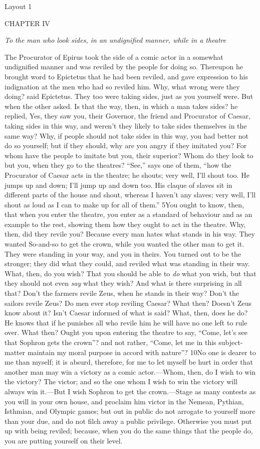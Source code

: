 Layout 1

CHAPTER IV

\emph{To the man who look sides, in an undignified manner, while in a theatre}

The Procurator of Epirus took the side of a comic actor in a somewhat undignified manner and was reviled by the people for doing so. Thereupon he brought word to Epictetus that he had been reviled, and gave expression to his indignation at the men who had so reviled him. Why, what wrong were they doing? said Epictetus. They too were taking sides, just as you yourself were. But when the other asked. Is that the way, then, in which a man takes sides? he replied, Yes, they saw you, their Governor, the friend and Procurator of Caesar, taking sides in this way, and weren't they likely to take sides themselves in the same way? Why, if people should not take sides in this way, you had better not do so yourself; but if they should, why are you angry if they imitated you? For whom have the people to imitate but you, their superior? Whom do they look to but you, when they go to the theatres? ``See,'' says one of them, ``how the Procurator of Caesar acts in the theatre; he shouts; very well, I'll shout too. He jumps up and down; I'll jump up and down too. His claque of slaves sit in different parts of the house and shout, whereas I haven't any slaves; very well, I'll shout as loud as I can to make up for all of them.'' 5You ought to know, then, that when you enter the theatre, you enter as a standard of behaviour and as an example to the rest, showing them how they ought to act in the theatre. Why, then, did they revile you? Because every man hates what stands in his way. They wanted So-and-so to get the crown, while you wanted the other man to get it. They were standing in your way, and you in theirs. You turned out to be the stronger; they did what they could, and reviled what was standing in their way. What, then, do you wish? That you should be able to \emph{do} what you wish, but that they should not even \emph{say} what they wish? And what is there surprising in all that? Don't the farmers revile Zeus, when he stands in their way? Don't the sailors revile Zeus? Do men ever stop reviling Caesar? What then? Doesn't Zeus know about it? Isn't Caesar informed of what is said? What, then, does he do? He knows that if he punishes all who revile him he will have no one left to rule over. What then? Ought you upon entering the theatre to say, ``Come, let's see that Sophron gets the crown''? and not rather, ``Come, let me in this subject-matter maintain my moral purpose in accord with nature''? 10No one is dearer to me than myself; it is absurd, therefore, for me to let myself be hurt in order that another man may win a victory as a comic actor.—Whom, then, do I wish to win the victory? The victor; and so the one whom I wish to win the victory will always win it.—But I wish Sophron to get the crown.—Stage as many contests as you will in your own house, and proclaim him victor in the Nemean, Pythian, Isthmian, and Olympic games; but out in public do not arrogate to yourself more than your due, and do not filch away a public privilege. Otherwise you must put up with being reviled; because, when you do the same things that the people do, you are putting yourself on their level.

